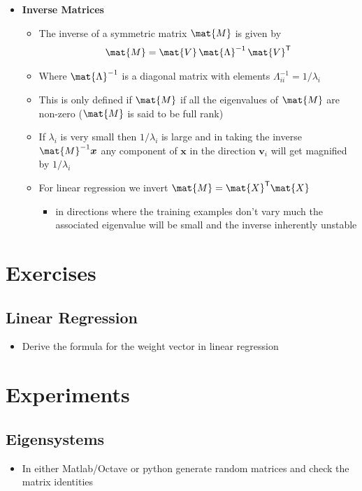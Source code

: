 \documentclass[11pt]{article}
\newcommand{\tr}{\textsf{T}}
\begin{document}
\begin{itemize}
\item \textbf{Inverse Matrices}
\begin{itemize}
\item The inverse of a symmetric matrix \(\mat{M}\) is given by
\begin{align*}
  \mat{M} = \mat{V}\,\mat{\Lambda}^{-1}\,\mat{V}^\tr
\end{align*}
\item Where \(\mat{\Lambda}^{-1}\) is a diagonal matrix with elements \(\Lambda_{ii}^{-1}=1/\lambda_i\)
\item This is only defined if \(\mat{M}\) if all the eigenvalues of
\(\mat{M}\) are non-zero  (\(\mat{M}\) is said to be full rank)
\item If \(\lambda_i\) is very small then \(1/\lambda_i\) is large and in
taking the inverse \(\mat{M}^{-1}\bm{x}\) any component of \(\bm{x}\)
in the direction \(\bm{v}_i\) will get magnified by \(1/\lambda_i\)
\item For linear regression we invert \(\mat{M} = \mat{X}^\tr\mat{X}\)
\begin{itemize}
\item in directions where the training examples don't vary much the
associated eigenvalue will be small and the inverse inherently
unstable
\end{itemize}
\end{itemize}
\end{itemize}


\section{Exercises}
\label{sec:orgda485f0}

\subsection{Linear Regression}
\label{sec:org183958f}
\begin{itemize}
\item Derive the formula for the weight vector in linear regression
\end{itemize}

\section{Experiments}
\label{sec:orgd980004}

\subsection{Eigensystems}
\label{sec:org1cf8d23}
\begin{itemize}
\item In either Matlab/Octave or python generate random matrices and check
the matrix identities
\end{itemize}
\end{document}
